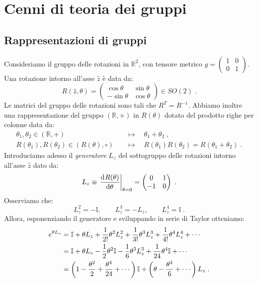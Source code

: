 \section{Cenni di teoria dei gruppi}
\subsection{Rappresentazioni di gruppi}
Consideriamo il gruppo delle rotazioni in $\mathbb{R}^2$, con tensore metrico $g=\left(\begin{matrix}
                                                                                        1 & 0 \\
0 & 1
                                                                                       \end{matrix}\right)$. Una rotazione intorno all'asse $\hat{z}$ è data da:
\begin{equation}
R(\hat{z},\theta)=\begin{pmatrix}
\cos\theta & \sin\theta \\
-\sin\theta & \cos\theta
\end{pmatrix}\in SO(2)\;.
\end{equation}                 
Le matrici del gruppo delle rotazioni sono tali che $R^T=R^{-1}$. Abbiamo inoltre una rappresentazione del gruppo $(\mathbb{R},+)$ in 
$R(\theta)$ dotato del prodotto righe per colonne data da:
\begin{align}
\theta_1,\theta_2\in (\mathbb{R},+)\quad  &\longmapsto \quad \theta_1+\theta_2\;, \\
R(\theta_1),R(\theta_2)\in(R(\theta),\circ) \quad & \longmapsto \quad R(\theta_1)R(\theta_2)=R(\theta_1+\theta_2)\;.
\end{align}
Introduciamo adesso il \textit{generatore} $L_z$ del sottogruppo delle rotazioni intorno all'asse $\hat{z}$ dato da:
\begin{equation}
L_z\equiv \left.\frac{\mathrm{d}^{}R(\theta)}{\mathrm{d}\theta^{}}\right|_{\theta=0}=\begin{pmatrix}
0 & 1 \\
-1 & 0
\end{pmatrix}\;.
\end{equation}
Osserviamo che:
\begin{equation}
L_z^2=-\mathbb{I},\qquad L_z^3=-L_z,\qquad L_z^4=\mathbb{I}\;.
\end{equation}
Allora, esponenziando il generatore e sviluppando in serie di Taylor otteniamo:
\begin{align}
e^{\theta L_z} &= \mathbb{I}+\theta L_z+\frac{1}{2!}\theta^2L_z^2+\frac{1}{3!}\theta^3L_z^3+\frac{1}{4!}\theta^4L_z^4+\cdots \notag \\
&= \mathbb{I}+\theta L_z-\frac{1}{2}\theta^2\mathbb{I}-\frac{1}{6}\theta^3L_z^3+\frac{1}{24}\theta^4\mathbb{I}+\cdots \notag \\
&= \left(1-\frac{\theta^2}{2}+\frac{\theta^4}{24}+\cdots\right)\mathbb{I}+\left(\theta-\frac{\theta^3}{6}+\cdots\right)L_z\;.
\end{align}
